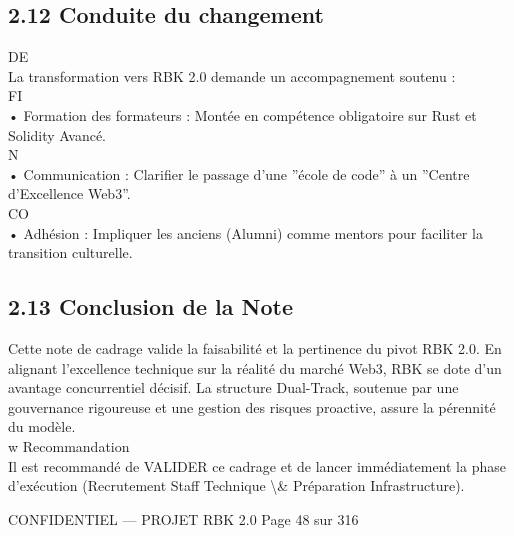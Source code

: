 \documentclass[12pt,landscape,a4paper]{article}
\newenvironment{confidential}
{\begin{tcolorbox}[
    colback=rbkred!5!white,
    colframe=rbkred!75!black,
    title=CONFIDENTIEL,
    fonttitle=\bfseries\color{white},
    coltitle=rbkred!75!black,
    breakable,
    enhanced,
    frame hidden,
    borderline west={2pt}{0pt}{rbkred!75!black}
]}
{\end{tcolorbox}}
\begin{document}
\subsection{2.12 Conduite du changement}
\vspace{0.5em}
\vspace{0.5em}
\vspace{0.5em}
\vspace{0.5em}
DE\\
La transformation vers RBK 2.0 demande un accompagnement soutenu :\\
\vspace{0.5em}
\vspace{0.5em}
\vspace{0.5em}
\vspace{0.5em}
FI\\
• Formation des formateurs : Montée en compétence obligatoire sur Rust et Solidity Avancé.\\
\vspace{0.5em}
\vspace{0.5em}
\vspace{0.5em}
N\\
• Communication : Clarifier le passage d’une ”école de code” à un ”Centre d’Excellence Web3”.\\
CO\\
• Adhésion : Impliquer les anciens (Alumni) comme mentors pour faciliter la transition culturelle.\\
\vspace{0.5em}
\vspace{0.5em}
\vspace{0.5em}
\subsection{2.13 Conclusion de la Note}
Cette note de cadrage valide la faisabilité et la pertinence du pivot RBK 2.0. En alignant l’excellence technique sur la réalité du marché Web3, RBK se dote d’un\\
avantage concurrentiel décisif. La structure Dual-Track, soutenue par une gouvernance rigoureuse et une gestion des risques proactive, assure la pérennité du modèle.\\
\vspace{0.5em}
w Recommandation\\
Il est recommandé de VALIDER ce cadrage et de lancer immédiatement la phase d’exécution (Recrutement Staff Technique \textbackslash{}& Préparation Infrastructure).\\
\vspace{0.5em}
\vspace{0.5em}
\vspace{0.5em}
\vspace{0.5em}
\begin{confidential}CONFIDENTIEL — PROJET RBK 2.0                                            Page 48 sur 316\end{confidential}
\end{document}
